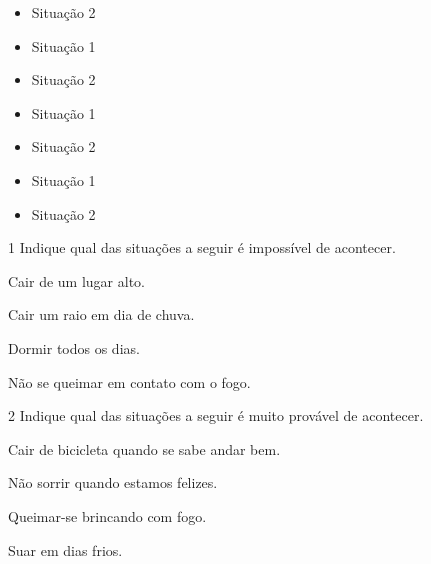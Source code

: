 \begin{itemize}
\item Situação 2
\end{itemize}


\begin{itemize}
\item Situação 1
\end{itemize}

\begin{itemize}
\item Situação 2
\end{itemize}


\begin{itemize}
\item Situação 1
\end{itemize}

\begin{itemize}
\item Situação 2
\end{itemize}


\begin{itemize}
\item Situação 1
\end{itemize}

\begin{itemize}
\item Situação 2
\end{itemize}


\num{1} Indique qual das situações a seguir é impossível de acontecer.

\begin{escolha}
\item Cair de um lugar alto.

\item Cair um raio em dia de chuva.

\item Dormir todos os dias.

\item Não se queimar em contato com o fogo.
\end{escolha}

\num{2} Indique qual das situações a seguir é muito provável de acontecer.

\begin{escolha}
\item Cair de bicicleta quando se sabe andar bem.

\item Não sorrir quando estamos felizes.

\item Queimar-se brincando com fogo.

\item Suar em dias frios.
\end{escolha}


